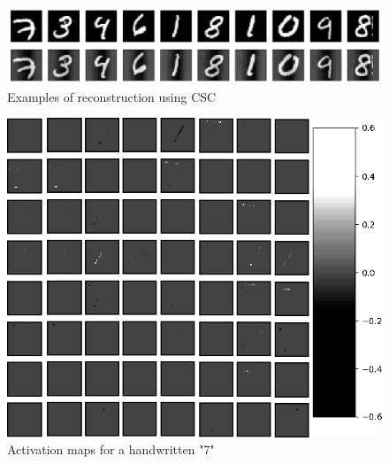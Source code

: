 \begin{figure}[h]
 \centering
 \includegraphics[scale=0.3]{CSC_reconstruction.png}
 \caption{Examples of reconstruction using CSC}
 \label{fig:CSC_recons}
\end{figure}

\begin{figure}[h]
 \centering
 \includegraphics[scale=0.7]{MapActivation7.png}
 \caption{Activation maps for a handwritten "7"}
 \label{fig:activationMaps}
\end{figure}

